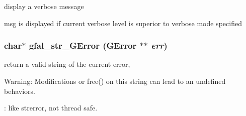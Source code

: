 display a verbose message 

msg is displayed if current verbose level is superior to verbose mode specified 
\subsubsection{\setlength{\rightskip}{0pt plus 5cm}char$\ast$ gfal\_\-str\_\-GError (GError $\ast$$\ast$ {\em err})}\label{gfal__common__errverbose_8h_c35c45ff43533cc6e7c176b0fa0b3128}


return a valid string of the current error, \begin{Desc}
\item[Warning:]Modifications or free() on this string can lead to an undefined behaviors. 

: like strerror, not thread safe. \end{Desc}
